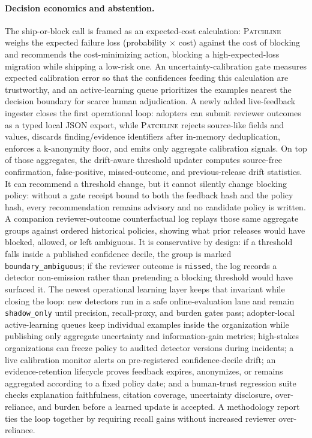 \documentclass[11pt]{article}
\newcommand{\tool}{\textsc{Patchline}}
\newcommand{\code}[1]{\texttt{#1}}
\begin{document}
\paragraph{Decision economics and abstention.} The ship-or-block call is framed as an expected-cost
calculation: \tool{} weighs the expected failure loss (probability $\times$ cost) against the cost of
blocking and recommends the cost-minimizing action, blocking a high-expected-loss migration while
shipping a low-risk one. An uncertainty-calibration gate measures expected calibration error so that
the confidences feeding this calculation are trustworthy, and an active-learning queue prioritizes the
examples nearest the decision boundary for scarce human adjudication. A newly added live-feedback
ingester closes the first operational loop: adopters can submit reviewer outcomes as a typed local JSON
export, while \tool{} rejects source-like fields and values, discards finding/evidence identifiers after
in-memory deduplication, enforces a k-anonymity floor, and emits only aggregate calibration signals.
On top of those aggregates, the drift-aware threshold updater computes source-free confirmation,
false-positive, missed-outcome, and previous-release drift statistics. It can recommend a threshold
change, but it cannot silently change blocking policy: without a gate receipt bound to both the feedback
hash and the policy hash, every recommendation remains advisory and no candidate policy is written. A
companion reviewer-outcome counterfactual log replays those same aggregate groups against ordered
historical policies, showing what prior releases would have blocked, allowed, or left ambiguous. It is
conservative by design: if a threshold falls inside a published confidence decile, the group is marked
\code{boundary\_ambiguous}; if the reviewer outcome is \code{missed}, the log records a detector
non-emission rather than pretending a blocking threshold would have surfaced it. The newest operational
learning layer keeps that invariant while closing the loop: new detectors run in a safe online-evaluation
lane and remain \code{shadow\_only} until precision, recall-proxy, and burden gates pass; adopter-local
active-learning queues keep individual examples inside the organization while publishing only aggregate
uncertainty and information-gain metrics; high-stakes organizations can freeze policy to audited detector
versions during incidents; a live calibration monitor alerts on pre-registered confidence-decile drift;
an evidence-retention lifecycle proves feedback expires, anonymizes, or remains aggregated according to a
fixed policy date; and a human-trust regression suite checks explanation faithfulness, citation coverage,
uncertainty disclosure, over-reliance, and burden before a learned update is accepted. A methodology report
ties the loop together by requiring recall gains without increased reviewer over-reliance.
\end{document}
